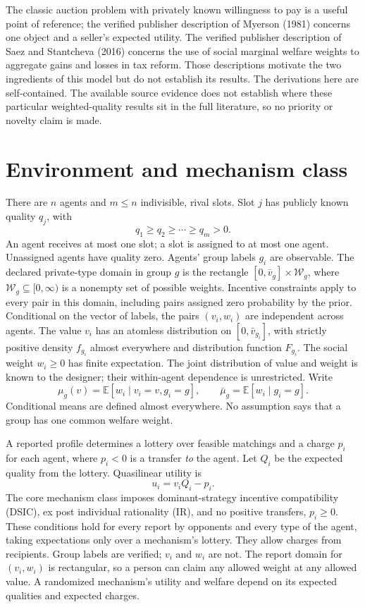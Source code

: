 \documentclass[11pt]{article}
\newcommand{\E}{\mathbb E}
\begin{document}
The classic auction problem with privately known willingness to pay is a useful point of reference; the verified publisher description of Myerson (1981) concerns one object and a seller's expected utility. The verified publisher description of Saez and Stantcheva (2016) concerns the use of social marginal welfare weights to aggregate gains and losses in tax reform. Those descriptions motivate the two ingredients of this model but do not establish its results. The derivations here are self-contained. The available source evidence does not establish where these particular weighted-quality results sit in the full literature, so no priority or novelty claim is made.

\section{Environment and mechanism class}\label{sec:model}

There are $n$ agents and $m\le n$ indivisible, rival slots. Slot $j$ has publicly known quality $q_j$, with
\[
q_1\ge q_2\ge\cdots\ge q_m>0.
\]
An agent receives at most one slot; a slot is assigned to at most one agent. Unassigned agents have quality zero. Agents' group labels $g_i$ are observable. The declared private-type domain in group $g$ is the rectangle $[0,\bar v_g]\times\mathcal W_g$, where $\mathcal W_g\subseteq[0,\infty)$ is a nonempty set of possible weights. Incentive constraints apply to every pair in this domain, including pairs assigned zero probability by the prior. Conditional on the vector of labels, the pairs $(v_i,w_i)$ are independent across agents. The value $v_i$ has an atomless distribution on $[0,\bar v_{g_i}]$, with strictly positive density $f_{g_i}$ almost everywhere and distribution function $F_{g_i}$. The social weight $w_i\ge0$ has finite expectation. The joint distribution of value and weight is known to the designer; their within-agent dependence is unrestricted. Write
\[
\mu_g(v)=\E[w_i\mid v_i=v,g_i=g],\qquad
\bar\mu_g=\E[w_i\mid g_i=g].
\]
Conditional means are defined almost everywhere. No assumption says that a group has one common welfare weight.

A reported profile determines a lottery over feasible matchings and a charge $p_i$ for each agent, where $p_i<0$ is a transfer \emph{to} the agent. Let $Q_i$ be the expected quality from the lottery. Quasilinear utility is
\begin{equation}\label{eq:utility}
u_i=v_iQ_i-p_i.
\end{equation}
The core mechanism class imposes dominant-strategy incentive compatibility (DSIC), ex post individual rationality (IR), and no positive transfers, $p_i\ge0$. These conditions hold for every report by opponents and every type of the agent, taking expectations only over a mechanism's lottery. They allow charges from recipients. Group labels are verified; $v_i$ and $w_i$ are not. The report domain for $(v_i,w_i)$ is rectangular, so a person can claim any allowed weight at any allowed value. A randomized mechanism's utility and welfare depend on its expected qualities and expected charges.
\end{document}

